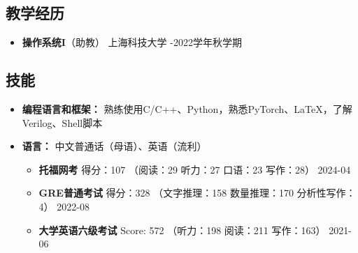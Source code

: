 \documentclass[a4paper,10pt]{ctexart} %
\begin{document}

\begin{keepsection}
\subsection{教学经历}

    \begin{itemize}
        \item \textbf{操作系统I}（助教） \hfill 上海科技大学 -2022学年秋学期
    \end{itemize}
\end{keepsection}



\begin{keepsection}

\section{技能}
\begin{itemize}
    \item \textbf{编程语言和框架：} 熟练使用C/C++、Python，熟悉PyTorch、\LaTeX，了解Verilog、Shell脚本
    \item \textbf{语言：} 中文普通话（母语）、英语（流利）
        \begin{itemize}
            \item \textbf{托福网考} \quad 得分：107 {\small （阅读：29 \quad 听力：27 \quad 口语：23 \quad 写作：28）} \hfill 2024-04
            \item \textbf{GRE普通考试} \quad 得分：328 {\small （文字推理：158 \quad 数量推理：170 \quad 分析性写作：4）} \hfill 2022-08
            \item \textbf{大学英语六级考试} \quad Score: 572 {\small （听力：198 \quad 阅读：211 \quad 写作：163）} \hfill 2021-06
        \end{itemize}
\end{itemize}

\end{keepsection}
\end{document}
